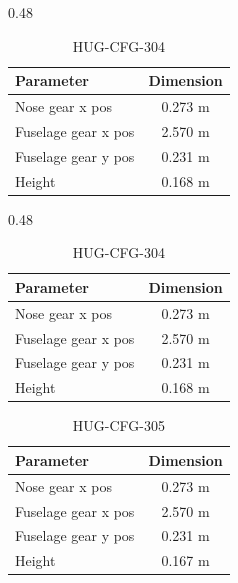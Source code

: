 \begin{table}[H]
    \begin{subtable}[t]{0.48\textwidth}
        \centering
        \caption{HUG-CFG-303}
        \begin{tabularx}{\linewidth}{|@{}X c@{}|}
            \hline
            \textbf{Parameter} & \textbf{Dimension}  \\
            \hline \hline
            Nose gear x pos &0.273 m \\
            Fuselage gear x pos &  2.570 m\\
            Fuselage gear y pos & 0.231 m\\
            Height & 0.168 m\\
            \hline
        \end{tabularx}
    \end{subtable}
    \hfill
    \begin{subtable}[t]{0.48\textwidth}
        \centering
        \caption{HUG-CFG-304}
        \begin{tabularx}{\linewidth}{|@{}X c@{}|}
            \hline
            \textbf{Parameter} & \textbf{Dimension }  \\
            \hline \hline
            
            Nose gear x pos &0.273 m \\
            Fuselage gear x pos &  2.570 m\\
            Fuselage gear y pos & 0.231 m\\
            Height & 0.168 m\\
            \hline
        \end{tabularx}
    \end{subtable}

    \vspace{0.5cm}

\end{table}

\begin{table}[H]
    \centering
    \caption{HUG-CFG-305}
    \label{tab:lg_305}
    \begin{tabularx}{0.45\textwidth}{|X c|}
        \hline
        \textbf{Parameter} & \textbf{Dimension} \\
        \hline\hline
        Nose gear x pos     & 0.273 m \\
        Fuselage gear x pos & 2.570 m \\
        Fuselage gear y pos & 0.231 m \\
        Height              & 0.167 m \\
        \hline
    \end{tabularx}
    \label{tab:landing_gear_tradeoff2}
\end{table}


